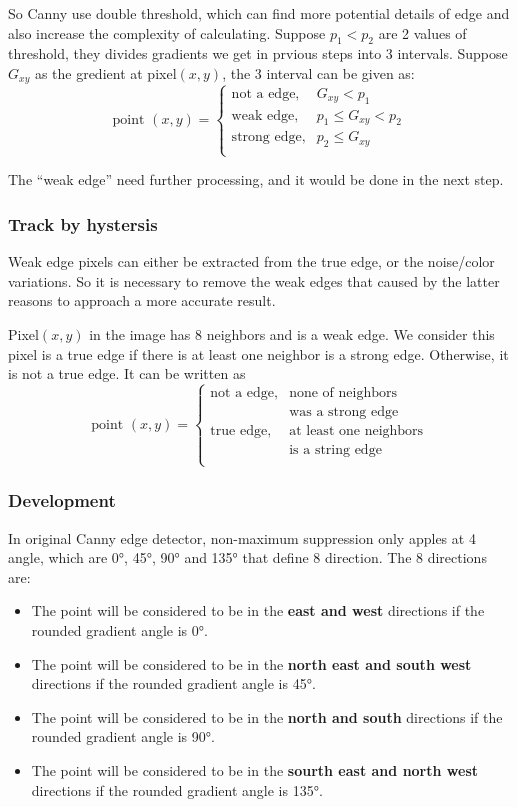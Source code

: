 \documentclass[10pt,twocolumn,letterpaper]{article}
\begin{document}
So Canny use double threshold\cite{ref10}, which can find more potential details 
of edge and also increase the complexity of calculating. Suppose $p_1 < p_2$ are 
2 values of threshold, they divides gradients we get in prvious steps into 3 
intervals. Suppose $G_{xy}$ as the gredient at pixel$(x, y)$, the 3 interval can
be given as: 
$$
\text{point $(x, y)$} = 
	\begin{cases}
		\text{not a edge}, & G_{xy} < p_1 \\
		\text{weak edge}, & p_1 \le G_{xy} < p_2 \\
		\text{strong edge}, & p_2 \le G_{xy} \\
	\end{cases}
$$

The ``weak edge'' need further processing, and it would be done in the next step. 

\subsubsection{Track by hystersis}

Weak edge pixels can either be extracted from the true edge, or the noise/color 
variations. So it is necessary to remove the weak edges that caused by the latter 
reasons to approach a more accurate result. 

Pixel$(x, y)$ in the image has 8 neighbors and is a weak edge. We consider this 
pixel is a true edge if there is at least one neighbor is a strong edge. Otherwise, 
it is not a true edge. It can be written as 
$$
\text{point $(x, y)$} = 
	\begin{cases}
		\text{not a edge}, & \text{none of neighbors} \\
			& \text{was a strong edge} \\
		\text{true edge}, &  \text{at least one neighbors} \\
			& \text{is a string edge} \\
	\end{cases}
$$

\subsubsection{Development}

In original Canny edge detector, non-maximum suppression only apples at 4 angle, 
which are 0°, 45°, 90° and 135° that define 8 direction.\cite{ref10} The 8 directions are: 

\begin{itemize}[noitemsep]
\item The point will be considered to be in the {\bf east and west} directions if the 
rounded gradient angle is 0°. 
\item The point will be considered to be in the {\bf north east and south west} directions if the 
rounded gradient angle is 45°. 
\item The point will be considered to be in the {\bf north and south} directions if the 
rounded gradient angle is 90°. 
\item The point will be considered to be in the {\bf sourth east and north west} directions if the 
rounded gradient angle is 135°. 
\end{itemize}
\end{document}
